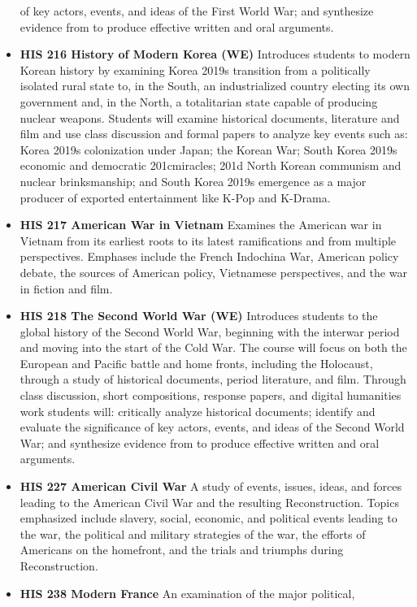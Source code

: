 \documentclass[
  letterpaper,
]{scrbook}
\begin{document}
\begin{itemize}
  of key actors, events, and ideas of the First World War; and
  synthesize evidence from to produce effective written and oral
  arguments.
\item
  \textbf{HIS 216 History of Modern Korea (WE)} Introduces students to
  modern Korean history by examining Korea 2019s transition from a
  politically isolated rural state to, in the South, an industrialized
  country electing its own government and, in the North, a totalitarian
  state capable of producing nuclear weapons. Students will examine
  historical documents, literature and film and use class discussion and
  formal papers to analyze key events such as: Korea 2019s colonization
  under Japan; the Korean War; South Korea 2019s economic and democratic
  201cmiracles; 201d North Korean communism and nuclear brinksmanship;
  and South Korea 2019s emergence as a major producer of exported
  entertainment like K-Pop and K-Drama.
\item
  \textbf{HIS 217 American War in Vietnam} Examines the American war in
  Vietnam from its earliest roots to its latest ramifications and from
  multiple perspectives. Emphases include the French Indochina War,
  American policy debate, the sources of American policy, Vietnamese
  perspectives, and the war in fiction and film.
\item
  \textbf{HIS 218 The Second World War (WE)} Introduces students to the
  global history of the Second World War, beginning with the interwar
  period and moving into the start of the Cold War. The course will
  focus on both the European and Pacific battle and home fronts,
  including the Holocaust, through a study of historical documents,
  period literature, and film. Through class discussion, short
  compositions, response papers, and digital humanities work students
  will: critically analyze historical documents; identify and evaluate
  the significance of key actors, events, and ideas of the Second World
  War; and synthesize evidence from to produce effective written and
  oral arguments.
\item
  \textbf{HIS 227 American Civil War} A study of events, issues, ideas,
  and forces leading to the American Civil War and the resulting
  Reconstruction. Topics emphasized include slavery, social, economic,
  and political events leading to the war, the political and military
  strategies of the war, the efforts of Americans on the homefront, and
  the trials and triumphs during Reconstruction.
\item
  \textbf{HIS 238 Modern France} An examination of the major political,

\end{itemize}
\end{document}
